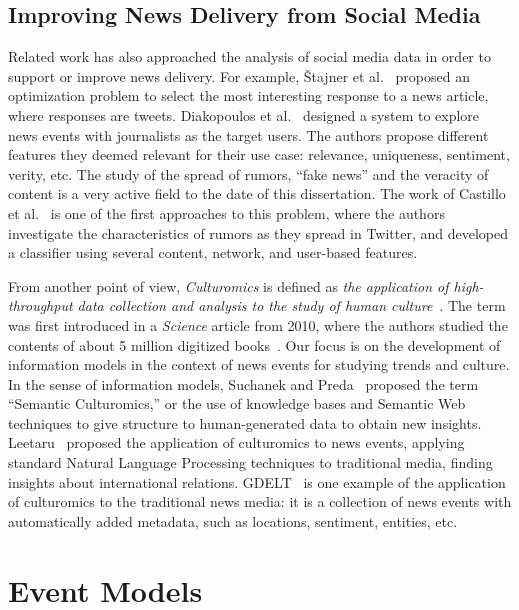 \subsection{Improving News Delivery from Social Media}
%
Related work has also approached the analysis of social media data in order to support or
improve news delivery. 
%
For example, \v{S}tajner et al.~\cite{Stajner:2013:ASS:2487575.2487659} proposed
an optimization problem to select the most interesting response to a news
article, where responses are tweets.
%
Diakopoulos et
al.~\cite{Diakopoulos:2012:FAS:2207676.2208409,diakopoulos2010diamonds} designed
a system to explore news events with journalists as the target users.
%
The authors propose different features they deemed relevant for their use
case: relevance, uniqueness, sentiment, verity, etc. 
%
The study of the spread of rumors, ``fake news'' and the veracity of content is
a very active field to the date of this dissertation.
%
The work of Castillo et al.~\cite{castillo2011information} is one of the first
approaches to this problem, where the authors investigate the characteristics of
rumors as they spread in Twitter, and developed a classifier using several
content, network, and user-based features.
%

From another point of view, {\em Culturomics} is defined as {\em the application
of high-throughput data collection and analysis to the study of human
culture}~\cite{Michel176}. 
%
The term was first introduced in a {\em Science} article from 2010, where the
authors studied the contents of about 5 million digitized
books~\cite{Michel176}. 
%
Our focus is on the development of information models in the context
of news events for studying trends and culture.
%
In the sense of information models, Suchanek and
Preda~\cite{Suchanek:2014:SC:2732977.2732994} proposed the term ``Semantic
Culturomics,'' or the use of knowledge bases and Semantic Web techniques to give
structure to human-generated data to obtain new insights.
Leetaru~\cite{leetaru2011culturomics} proposed the application of culturomics to
news events, applying standard Natural Language Processing techniques to
traditional media, finding insights about international relations.
%
GDELT~\cite{leetaru2013gdelt} is one example of the application of culturomics
to the traditional news media: it is a collection of news events with
automatically added metadata, such as locations, sentiment, entities, etc.


\section{Event Models}


